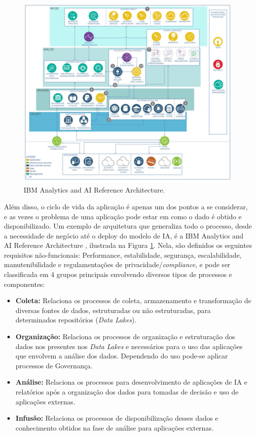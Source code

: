\documentclass[portugues, 12pt, a4paper]{article}
\begin{document}
\begin{figure}[h]
\centering
\includegraphics[scale=0.25]{images/ai-analytics-ref-diagram-analyze.jpg}
\caption {IBM Analytics and AI Reference Architecture.}
\label{fig:AIReferenceArchitecture}
\end{figure}

Além disso, o ciclo de vida da aplicação é apenas um dos pontos a se considerar, e as vezes o problema de uma aplicação pode estar em como o dado é obtido e disponibilizado. Um exemplo de arquitetura que generaliza todo o processo, desde a necessidade de negócio até o deploy do modelo de IA, é a IBM Analytics and AI Reference Architecture \citep{IBM_2021}, ilustrada na Figura \ref{fig:AIReferenceArchitecture}. Nela, são definidos os seguintes requisitos não-funcionais: Performance, estabilidade, segurança, escalabilidade, manutenibilidade e regulamentações de privacidade/\textit{compliance}, e pode ser classificada em 4 grupos principais envolvendo diversos tipos de processos e componentes:

\begin{itemize}
\item \textbf{Coleta:} Relaciona os processos de coleta, armazenamento e transformação de diversas fontes de dados, estruturadas ou não estruturadas, para determinados repositórios (\textit{Data Lakes}).
\item \textbf{Organização:} Relaciona os processos de organização e estruturação dos dados nos presentes nos \textit{Data Lakes} e necessários para o uso das aplicações que envolvem a análise dos dados. Dependendo do uso pode-se aplicar processos de Governança.
\item \textbf{Análise:} Relaciona os processos para desenvolvimento de aplicações de IA e relatórios após a organização dos dados para tomadas de decisão e uso de aplicações externas.
\item \textbf{Infusão:} Relaciona os processos de disponibilização desses dados e conhecimento obtidos na fase de análise para aplicações externas.
\end{itemize}
\end{document}
